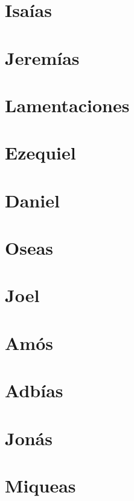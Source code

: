 \chapter{Isaías}



\chapter{Jeremías}



\chapter{Lamentaciones}



\chapter{Ezequiel}



\chapter{Daniel}



\chapter{Oseas}



\chapter{Joel}



\chapter{Amós}



\chapter{Adbías}



\chapter{Jonás}



\chapter{Miqueas}




